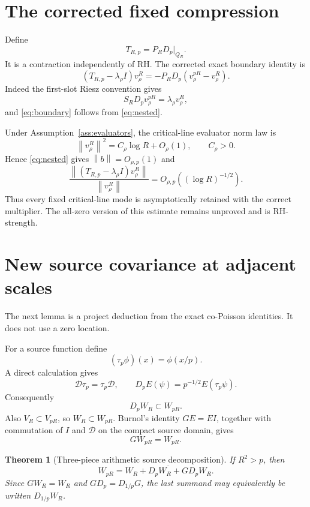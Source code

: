 \documentclass[11pt]{article}
\newtheorem{theorem}{Theorem}[section]
\theoremstyle{remark}
\newcommand{\norm}[1]{\left\lVert #1\right\rVert}
\begin{document}
\section{The corrected fixed compression}
Define
\[
 T_{R,p}=P_RD_p\big|_{Q_R}.
\]
It is a contraction independently of RH. The corrected exact boundary identity is
\begin{equation}\label{eq:boundary}
 (T_{R,p}-\lambda_\rho I)v_\rho^R
 =-P_RD_p(v_\rho^{pR}-v_\rho^R).
\end{equation}
Indeed the first-slot Riesz convention gives
\[
 S_RD_pv_\rho^{pR}=\lambda_\rho v_\rho^R,
\]
and \eqref{eq:boundary} follows from \eqref{eq:nested}.

Under Assumption~\ref{ass:evaluators}, the critical-line evaluator norm law is
\[
 \norm{v_\rho^R}^2=C_\rho\log R+O_\rho(1),\qquad C_\rho>0.
\]
Hence \eqref{eq:nested} gives $\norm b=O_{\rho,p}(1)$ and
\begin{equation}\label{eq:criticalrate}
 \frac{\norm{(T_{R,p}-\lambda_\rho I)v_\rho^R}}{\norm{v_\rho^R}}
 =O_{\rho,p}((\log R)^{-1/2}).
\end{equation}
Thus every fixed critical-line mode is asymptotically retained with the correct multiplier. The all-zero version of this estimate remains unproved and is RH-strength.

\section{New source covariance at adjacent scales}
The next lemma is a project deduction from the exact co-Poisson identities. It does not use a zero location.

For a source function define
\[
 (\tau_p\phi)(x)=\phi(x/p).
\]
A direct calculation gives
\begin{equation}\label{eq:covariance}
 \mathcal D\tau_p=\tau_p\mathcal D,
 \qquad
 D_pE(\psi)=p^{-1/2}E(\tau_p\psi).
\end{equation}
Consequently
\begin{equation}\label{eq:DWinclusion}
 D_pW_R\subset W_{pR}.
\end{equation}
Also $V_R\subset V_{pR}$, so $W_R\subset W_{pR}$. Burnol's identity $GE=EI$, together with commutation of $I$ and $\mathcal D$ on the compact source domain, gives
\[
 GW_{pR}=W_{pR}.
\]

\begin{theorem}[Three-piece arithmetic source decomposition]\label{thm:threepiece}
If $R^2>p$, then
\begin{equation}\label{eq:Wdecomp}
 W_{pR}=\overline{W_R+D_pW_R+GD_pW_R}.
\end{equation}
Since $GW_R=W_R$ and $GD_p=D_{1/p}G$, the last summand may equivalently be written $D_{1/p}W_R$.
\end{theorem}
\end{document}
